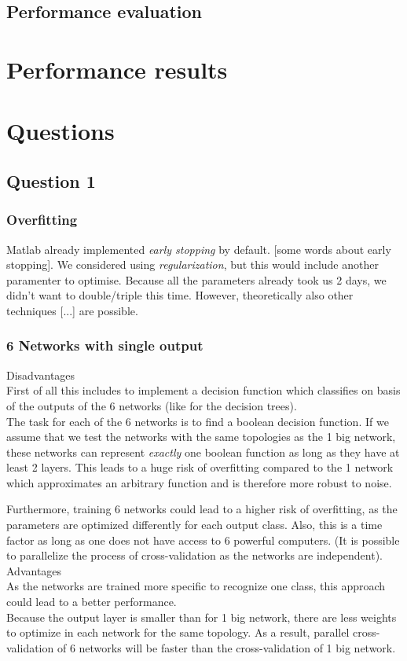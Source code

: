 \documentclass{article}
\begin{document}
\subsection{Performance evaluation}


\section{Performance results}


\section{Questions}


\subsection{Question 1}

\subsubsection{Overfitting}
Matlab already implemented \emph{early stopping} by default. [some words about early stopping]. We considered using \emph{regularization}, but this would include another paramenter to optimise. Because all the parameters already took us 2 days, we didn't want to double/triple this time. However, theoretically also other techniques [...] are possible.

\subsubsection{6 Networks with single output}
Disadvantages\\
First of all this includes to implement a decision function which classifies on basis of the outputs of the 6 networks (like for the decision trees).\\
The task for each of the 6 networks is to find a boolean decision function. If we assume that we test the networks with the same topologies as the 1 big network, these networks can represent \textit{exactly} one boolean function as long as they have at least 2 layers. This leads to a huge risk of overfitting compared to the 1 network which approximates an arbitrary function and is therefore more robust to noise.

Furthermore, training 6 networks could lead to a higher risk of overfitting, as the parameters are optimized differently for each output class. Also, this is a time factor as long as one does not have access to 6 powerful computers. (It is possible to parallelize the process of cross-validation as the networks are independent).
\\
Advantages\\
As the networks are trained more specific to recognize one class, this approach could lead to a better performance.\\
Because the output layer is smaller than for 1 big network, there are less weights to optimize in each network for the same topology. As a result, parallel cross-validation of 6 networks will be faster than the cross-validation of 1 big network.
\end{document}
